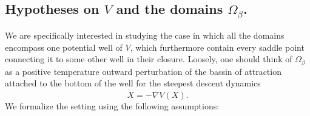 \documentclass[10pt]{article}
\newcommand{\1}{\mathbbm 1}
\begin{document}
    \subsection{Hypotheses on $V$ and the domains $\Omega_\beta$.\newline}
    
    We are specifically interested in studying the case in which all the domains encompass one potential well of $V$, which furthermore contain every saddle point connecting it to some other well in their closure.
    Loosely, one should think of $\Omega_\beta$ as a positive temperature outward perturbation of the bassin of attraction attached to the bottom of the well for the steepest descent dynamics
    \begin{equation}
        \label{eq:gradient_flow}
        \dot X = -\nabla V(X).
    \end{equation}
    We formalize the setting using the following assumptions:
\end{document}
